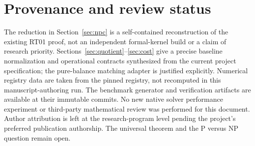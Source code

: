 \documentclass[11pt,letterpaper]{article}
\theoremstyle{definition}
\begin{document}
\section{Provenance and review status}
The reduction in Section~\ref{sec:npc} is a self-contained reconstruction of the existing RT01 proof, not an independent formal-kernel build or a claim of research priority. Sections~\ref{sec:quotient}--\ref{sec:cost} give a precise baseline normalization and operational contracts synthesized from the current project specification; the pure-balance matching adapter is justified explicitly. Numerical registry data are taken from the pinned registry, not recomputed in this manuscript-authoring run. The benchmark generator and verification artifacts are available at their immutable commits. No new native solver performance experiment or third-party mathematical review was performed for this document. Author attribution is left at the research-program level pending the project's preferred publication authorship. The universal theorem and the P versus NP question remain open.

\clearpage
\printbibliography[heading=bibintoc,title={References}]
\end{document}

